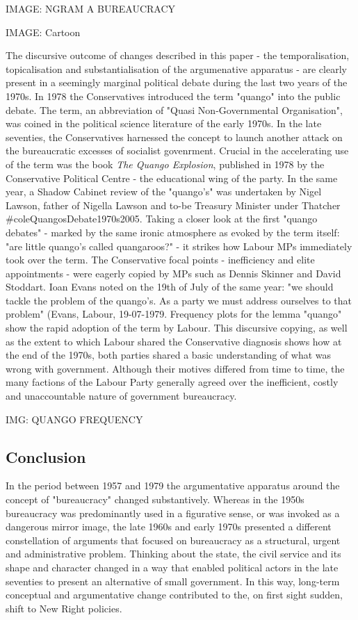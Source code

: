 \documentclass[
]{article}
\begin{document}
IMAGE: NGRAM A BUREAUCRACY

IMAGE: Cartoon

The discursive outcome of changes described in this paper - the
temporalisation, topicalisation and substantialisation of the
argumenative apparatus - are clearly present in a seemingly marginal
political debate during the last two years of the 1970s. In 1978 the
Conservatives introduced the term "quango" into the public debate. The
term, an abbreviation of "Quasi Non-Governmental Organisation", was
coined in the political science literature of the early 1970s. In the
late seventies, the Conservatives harnessed the concept to launch
another attack on the bureaucratic excesses of socialist govenrment.
Crucial in the accelerating use of the term was the book \emph{The
Quango Explosion}, published in 1978 by the Conservative Political
Centre - the educational wing of the party. In the same year, a Shadow
Cabinet review of the "quango's" was undertaken by Nigel Lawson, father
of Nigella Lawson and to-be Treasury Minister under Thatcher
\#coleQuangosDebate1970s2005. Taking a closer look at the first "quango
debates" - marked by the same ironic atmosphere as evoked by the term
itself: "are little quango's called quangaroos?" - it strikes how Labour
MPs immediately took over the term. The Conservative focal points -
inefficiency and elite appointments - were eagerly copied by MPs such as
Dennis Skinner and David Stoddart. Ioan Evans noted on the 19th of July
of the same year: "we should tackle the problem of the quango's. As a
party we must address ourselves to that problem" (Evans, Labour,
19-07-1979. Frequency plots for the lemma "quango" show the rapid
adoption of the term by Labour. This discursive copying, as well as the
extent to which Labour shared the Conservative diagnosis shows how at
the end of the 1970s, both parties shared a basic understanding of what
was wrong with government. Although their motives differed from time to
time, the many factions of the Labour Party generally agreed over the
inefficient, costly and unaccountable nature of government bureaucracy.

IMG: QUANGO FREQUENCY

\hypertarget{header-n77}{%
\subsection{Conclusion}\label{header-n77}}

In the period between 1957 and 1979 the argumentative apparatus around
the concept of "bureaucracy" changed substantively. Whereas in the 1950s
bureaucracy was predominantly used in a figurative sense, or was invoked
as a dangerous mirror image, the late 1960s and early 1970s presented a
different constellation of arguments that focused on bureaucracy as a
structural, urgent and administrative problem. Thinking about the state,
the civil service and its shape and character changed in a way that
enabled political actors in the late seventies to present an alternative
of small government. In this way, long-term conceptual and argumentative
change contributed to the, on first sight sudden, shift to New Right
policies.
\end{document}
